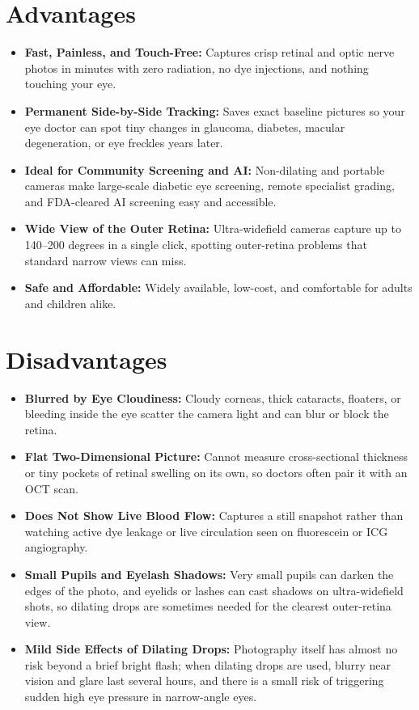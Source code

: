 \section{Advantages}

\begin{itemize}
    \item \textbf{Fast, Painless, and Touch-Free:} Captures crisp retinal and optic nerve photos in minutes with zero radiation, no dye injections, and nothing touching your eye.
    \item \textbf{Permanent Side-by-Side Tracking:} Saves exact baseline pictures so your eye doctor can spot tiny changes in glaucoma, diabetes, macular degeneration, or eye freckles years later.
    \item \textbf{Ideal for Community Screening and AI:} Non-dilating and portable cameras make large-scale diabetic eye screening, remote specialist grading, and FDA-cleared AI screening easy and accessible.
    \item \textbf{Wide View of the Outer Retina:} Ultra-widefield cameras capture up to 140--200 degrees in a single click, spotting outer-retina problems that standard narrow views can miss.
    \item \textbf{Safe and Affordable:} Widely available, low-cost, and comfortable for adults and children alike.
\end{itemize}

\section{Disadvantages}

\begin{itemize}
    \item \textbf{Blurred by Eye Cloudiness:} Cloudy corneas, thick cataracts, floaters, or bleeding inside the eye scatter the camera light and can blur or block the retina.
    \item \textbf{Flat Two-Dimensional Picture:} Cannot measure cross-sectional thickness or tiny pockets of retinal swelling on its own, so doctors often pair it with an OCT scan.
    \item \textbf{Does Not Show Live Blood Flow:} Captures a still snapshot rather than watching active dye leakage or live circulation seen on fluorescein or ICG angiography.
    \item \textbf{Small Pupils and Eyelash Shadows:} Very small pupils can darken the edges of the photo, and eyelids or lashes can cast shadows on ultra-widefield shots, so dilating drops are sometimes needed for the clearest outer-retina view.
    \item \textbf{Mild Side Effects of Dilating Drops:} Photography itself has almost no risk beyond a brief bright flash; when dilating drops are used, blurry near vision and glare last several hours, and there is a small risk of triggering sudden high eye pressure in narrow-angle eyes.
\end{itemize}

